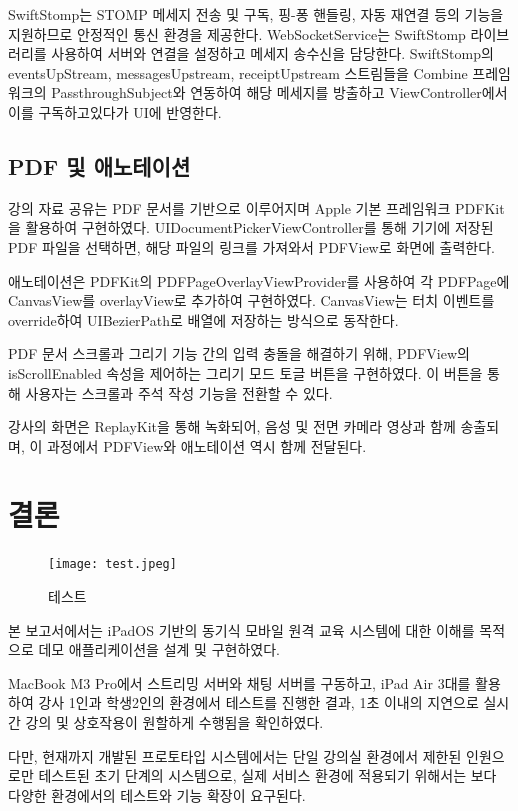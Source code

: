 \documentclass[10pt, a4paper, oneside]{article}
\begin{document}
SwiftStomp는 STOMP 메세지 전송 및 구독, 핑-퐁 핸들링, 자동 재연결 등의 기능을 지원하므로 안정적인 통신 환경을 제공한다. WebSocketService는 SwiftStomp 라이브러리를 사용하여 서버와 연결을 설정하고 메세지 송수신을 담당한다. SwiftStomp의 eventsUpStream, messagesUpstream, receiptUpstream 스트림들을 Combine 프레임워크의 PassthroughSubject와 연동하여 해당 메세지를 방출하고 ViewController에서 이를 구독하고있다가 UI에 반영한다.

\subsection{PDF 및 애노테이션}
강의 자료 공유는 PDF 문서를 기반으로 이루어지며 Apple 기본 프레임워크 PDFKit을 활용하여 구현하였다. UIDocumentPickerViewController를 통해 기기에 저장된 PDF 파일을 선택하면, 해당 파일의 링크를 가져와서 PDFView로 화면에 출력한다.

애노테이션은 PDFKit의 PDFPageOverlayViewProvider를 사용하여 각 PDFPage에 CanvasView를 overlayView로 추가하여 구현하였다. CanvasView는 터치 이벤트를 override하여 UIBezierPath로 배열에 저장하는 방식으로 동작한다.

PDF 문서 스크롤과 그리기 기능 간의 입력 충돌을 해결하기 위해, PDFView의 isScrollEnabled 속성을 제어하는 그리기 모드 토글 버튼을 구현하였다. 이 버튼을 통해 사용자는 스크롤과 주석 작성 기능을 전환할 수 있다.

강사의 화면은 ReplayKit을 통해 녹화되어, 음성 및 전면 카메라 영상과 함께 송출되며, 이 과정에서 PDFView와 애노테이션 역시 함께 전달된다.
\newpage
\section{결론}
\begin{figure}[htbp]
    \begin{center}
    \texttt{[image: test.jpeg]}
    \caption{테스트}
    \label{fig:fig4}
    \end{center}
\end{figure}


본 보고서에서는 iPadOS 기반의 동기식 모바일 원격 교육 시스템에 대한 이해를 목적으로 데모 애플리케이션을 설계 및 구현하였다.

MacBook M3 Pro에서 스트리밍 서버와 채팅 서버를 구동하고, iPad Air 3대를 활용하여 강사 1인과 학생2인의 환경에서 테스트를 진행한 결과, 1초 이내의 지연으로 실시간 강의 및 상호작용이 원할하게 수행됨을 확인하였다.

다만, 현재까지 개발된 프로토타입 시스템에서는 단일 강의실 환경에서 제한된 인원으로만 테스트된 초기 단계의 시스템으로, 실제 서비스 환경에 적용되기 위해서는 보다 다양한 환경에서의 테스트와 기능 확장이 요구된다.
\end{document}
